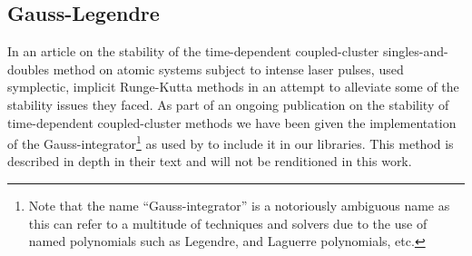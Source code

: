         \subsection{Gauss-Legendre}
            \label{subsec:gauss-legendre}
            In an article on the stability of the time-dependent coupled-cluster
            singles-and-doubles method on atomic systems subject to intense
            laser pulses, \citeauthor{pedersen2018symplectic}
            \cite{pedersen2018symplectic} used symplectic, implicit Runge-Kutta
            methods in an attempt to alleviate some of the stability issues they
            faced.
            As part of an ongoing publication on the stability of time-dependent
            coupled-cluster methods \cite{oa-stability} we have been given the
            implementation of the Gauss-integrator\footnote{%
                Note that the name ``Gauss-integrator'' is a notoriously
                ambiguous name as this can refer to a multitude of techniques
                and solvers due to the use of named polynomials such as
                Legendre, and Laguerre polynomials, etc.%
            } as used by \citeauthor{pedersen2018symplectic}
            \cite{pedersen2018symplectic} to include it in our libraries.
            This method is described in depth in their text
             \cite{pedersen2018symplectic} and
            will not be renditioned in this work.

\clearemptydoublepage
